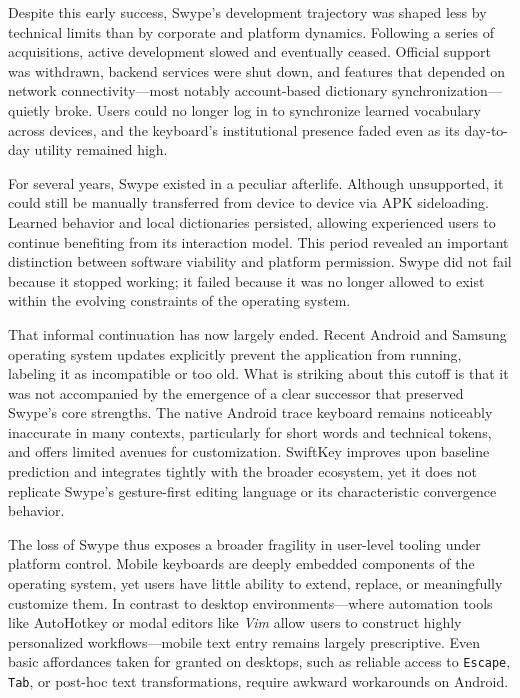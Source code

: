 \documentclass[11pt]{article}
\begin{document}
Despite this early success, Swype’s development trajectory was shaped less by technical limits than by corporate and platform dynamics. Following a series of acquisitions, active development slowed and eventually ceased. Official support was withdrawn, backend services were shut down, and features that depended on network connectivity—most notably account-based dictionary synchronization—quietly broke. Users could no longer log in to synchronize learned vocabulary across devices, and the keyboard’s institutional presence faded even as its day-to-day utility remained high.

For several years, Swype existed in a peculiar afterlife. Although unsupported, it could still be manually transferred from device to device via APK sideloading. Learned behavior and local dictionaries persisted, allowing experienced users to continue benefiting from its interaction model. This period revealed an important distinction between software viability and platform permission. Swype did not fail because it stopped working; it failed because it was no longer allowed to exist within the evolving constraints of the operating system.

That informal continuation has now largely ended. Recent Android and Samsung operating system updates explicitly prevent the application from running, labeling it as incompatible or too old. What is striking about this cutoff is that it was not accompanied by the emergence of a clear successor that preserved Swype’s core strengths. The native Android trace keyboard remains noticeably inaccurate in many contexts, particularly for short words and technical tokens, and offers limited avenues for customization. SwiftKey improves upon baseline prediction and integrates tightly with the broader ecosystem, yet it does not replicate Swype’s gesture-first editing language or its characteristic convergence behavior.

The loss of Swype thus exposes a broader fragility in user-level tooling under platform control. Mobile keyboards are deeply embedded components of the operating system, yet users have little ability to extend, replace, or meaningfully customize them. In contrast to desktop environments—where automation tools like AutoHotkey or modal editors like \textit{Vim} allow users to construct highly personalized workflows—mobile text entry remains largely prescriptive. Even basic affordances taken for granted on desktops, such as reliable access to \texttt{Escape}, \texttt{Tab}, or post-hoc text transformations, require awkward workarounds on Android.
\end{document}
